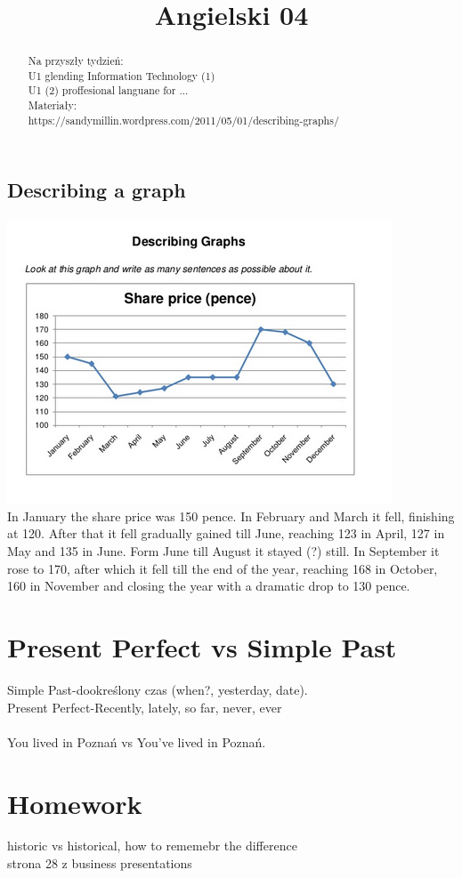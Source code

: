 \documentclass[a4paper,10pt]{article}
\title{Angielski 04}
\author{}
\begin{document}
\maketitle

\begin{abstract}
Na przyszły tydzień: \\
U1 glending Information Technology (1)\\
U1 (2) proffesional languane for ... \\

Materiały: \\
https://sandymillin.wordpress.com/2011/05/01/describing-graphs/ \\

\end{abstract}

\subsection{Describing a graph}
\includegraphics[width=\textwidth]{ang-2019-11-07-describe.png} \\
In January the share price was 150 pence. In February and March it fell, finishing at 120. After that it fell gradually gained till June, reaching 123 in April, 127 in May and 135 in June. Form June till August it stayed (?) still. In September it rose to 170, after which it fell till the end of the year, reaching 168 in October, 160 in November and closing the year with a dramatic drop to 130 pence.

\section{Present Perfect vs Simple Past}
Simple Past-dookreślony czas (when?, yesterday, date). \\
Present Perfect-Recently, lately, so far, never, ever \\
\\
You lived in Poznań vs You've lived in Poznań.\\


\section{Homework}
historic vs historical, how to rememebr the difference \\
strona 28 z business presentations
\end{document}
